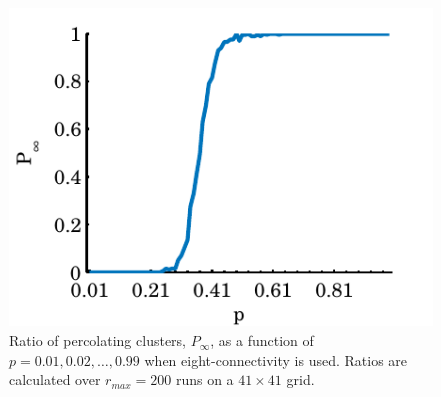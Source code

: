 \begin{figure}
	\centering
	\includegraphics[width=\columnwidth]{./img/assignment_d_p_infinite_ratio_p.pdf}
	\caption{Ratio of percolating clusters, $P_\infty$, as a function of $p = 0.01, 0.02, \dotsc, 0.99$ when eight-connectivity is used. Ratios are calculated over $r_{max} = 200$ runs on a $41 \times 41$ grid.}
	\label{fig:experiment:conn:p_inf_ratio}
\end{figure}



